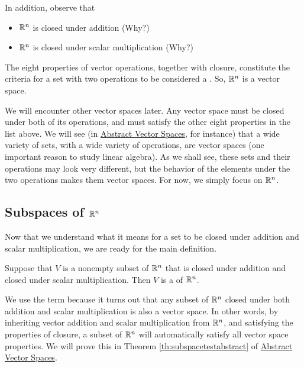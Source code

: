\documentclass{ximera}
\begin{document}
  In addition, observe that  
  \begin{itemize}
      \item[]  $\mathbb{R}^n$ is closed under addition (Why?)
      \item[] $\mathbb{R}^n$ is closed under scalar multiplication (Why?)
\end{itemize}      
      The eight properties of vector operations, together with closure, constitute the criteria for a set with two operations to be considered a . So, $\mathbb{R}^n$ is a vector space.  
      
      We will encounter other vector spaces later. Any vector space must be closed under both of its operations, and must satisfy the other eight properties in the list above.  We will see (in \href{https://ximera.osu.edu/linearalgebradzv3/LinearAlgebraInteractiveIntro/VSP-0050/main}{Abstract Vector Spaces}, for instance) that a wide variety of sets, with a wide variety of operations, are vector spaces (one important reason to study linear algebra).  As we shall see, these sets and their operations may look very different, but the behavior of the elements under the two operations makes them vector spaces.  For now, we simply focus on $\mathbb{R}^n$.


\subsection*{Subspaces of $\mathbb{R}^n$}

Now that we understand what it means for a set to be closed under addition and scalar multiplication, we are ready for the main definition.

\begin{definition}\label{def:subspace} Suppose that $V$ is a nonempty subset of $\mathbb{R}^n$ that is closed under addition and closed under scalar multiplication.  Then $V$ is a  of $\mathbb{R}^n$.
\end{definition}
We use the term  because it turns out that any subset of $\mathbb{R}^n$ closed under both addition and scalar multiplication is also a vector space.  In other words, by inheriting vector addition and scalar multiplication from $\mathbb{R}^n$, and satisfying the properties of closure, a subset of $\mathbb{R}^n$ will automatically satisfy all vector space properties.  We will prove this in Theorem \ref{th:subspacetestabstract} of \href{https://ximera.osu.edu/linearalgebradzv3/LinearAlgebraInteractiveIntro/VSP-0050/main}{Abstract Vector Spaces}.
\end{document}
